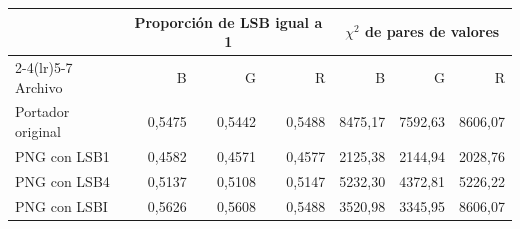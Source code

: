 \begin{tabular}{lrrrrrr}
\toprule
 & \multicolumn{3}{c}{Proporción de LSB igual a 1} & \multicolumn{3}{c}{$\chi^2$ de pares de valores} \\
\cmidrule(lr){2-4}\cmidrule(lr){5-7}
Archivo & B & G & R & B & G & R \\
\midrule
Portador original & 0{,}5475 & 0{,}5442 & 0{,}5488 & 8475{,}17 & 7592{,}63 & 8606{,}07 \\
PNG con LSB1 & 0{,}4582 & 0{,}4571 & 0{,}4577 & 2125{,}38 & 2144{,}94 & 2028{,}76 \\
PNG con LSB4 & 0{,}5137 & 0{,}5108 & 0{,}5147 & 5232{,}30 & 4372{,}81 & 5226{,}22 \\
PNG con LSBI & 0{,}5626 & 0{,}5608 & 0{,}5488 & 3520{,}98 & 3345{,}95 & 8606{,}07 \\
\bottomrule
\end{tabular}
